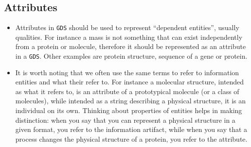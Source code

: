\documentclass[a4paper,10pt]{article}
\newcommand{\term}[1]{\texttt{#1}\xspace}
\newcommand{\gds}{\term{GDS}}
\begin{document}
\subsection{Attributes}
\begin{itemize}
\item Attributes in \gds should be used to represent ``dependent entities'', usually qualities. For instance a mass is not something that can exist independently from a protein or molecule, therefore it should be represented as an attribute in a \gds. Other examples are protein structure, sequence of a gene or protein. 
\item It is worth noting that we often use the same terms to refer to information entities and what their refer to. For instance a molecular structure, intended as what it refers to, is an attribute of a prototypical molecule (or a class of molecules), while intended as a string describing a physical structure, it is an individual on its own. Thinking about properties of entities helps in making distinction: when you say that you can represent a physical structure in a given format, you refer to the information artifact, while when you say that a process changes the physical structure of a protein, you refer to the attribute.

\end{itemize}




\end{document}
